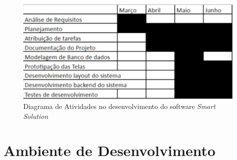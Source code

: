 \begin{figure}[H]
	\caption{\label{diagramaDeAtividades}Diagrama de Atividades no desenvolvimento do software \textit{Smart Solution}}
	\begin{center}
		\includegraphics[scale=0.72 ]{./Figuras/diagramaDeAtividades}
		
	\end{center}
\end{figure}
\newpage
\section{Ambiente de Desenvolvimento}




